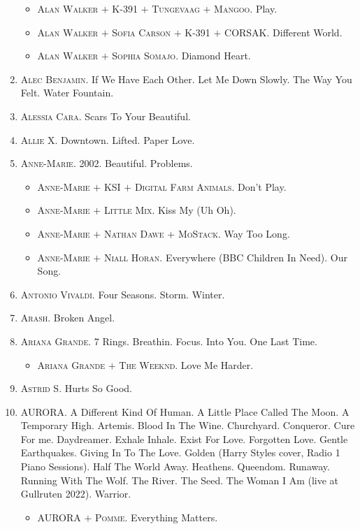 \documentclass[oneside]{book}
\numberwithin{equation}{section}
\begin{document}
\begin{enumerate}
\begin{itemize}
		\item \textsc{Alan Walker $+$ K-391 $+$ Tungevaag $+$ Mangoo.} Play.
		\item \textsc{Alan Walker $+$ Sofia Carson $+$ K-391 $+$ CORSAK.} Different World.
		\item \textsc{Alan Walker $+$ Sophia Somajo.} Diamond Heart.
	\end{itemize}
	\item \textsc{Alec Benjamin.} If We Have Each Other. Let Me Down Slowly. The Way You Felt. Water Fountain.
	\item \textsc{Alessia Cara.} Scars To Your Beautiful.
	\item \textsc{Allie X.} Downtown. Lifted. Paper Love.
	\item \textsc{Anne-Marie.} 2002. Beautiful. Problems.
	\begin{itemize}
		\item \textsc{Anne-Marie $+$ KSI $+$ Digital Farm Animals.} Don't Play.
		\item \textsc{Anne-Marie $+$ Little Mix.} Kiss My (Uh Oh).
		\item \textsc{Anne-Marie $+$ Nathan Dawe $+$ MoStack.} Way Too Long.
		\item \textsc{Anne-Marie $+$ Niall Horan.} Everywhere (BBC Children In Need). Our Song.
	\end{itemize}
	\item \textsc{Antonio Vivaldi.} Four Seasons. Storm. Winter.
	\item \textsc{Arash.} Broken Angel.
	\item \textsc{Ariana Grande.} 7 Rings. Breathin. Focus. Into You. One Last Time.
	\begin{itemize}
		\item \textsc{Ariana Grande $+$ The Weeknd.} Love Me Harder.
	\end{itemize}
	\item \textsc{Astrid S.} Hurts So Good.
	\item \textsc{AURORA.} A Different Kind Of Human. A Little Place Called The Moon. A Temporary High. Artemis. Blood In The Wine. Churchyard. Conqueror. Cure For me. Daydreamer. Exhale Inhale. Exist For Love. Forgotten Love. Gentle Earthquakes. Giving In To The Love. Golden (Harry Styles  cover, Radio 1 Piano Sessions). Half The World Away. Heathens. Queendom. Runaway. Running With The Wolf. The River. The Seed. The Woman I Am (live at Gullruten 2022). Warrior.
	\begin{itemize}
		\item \textsc{AURORA $+$ Pomme.} Everything Matters.

\end{itemize}
\end{enumerate}
\end{document}
